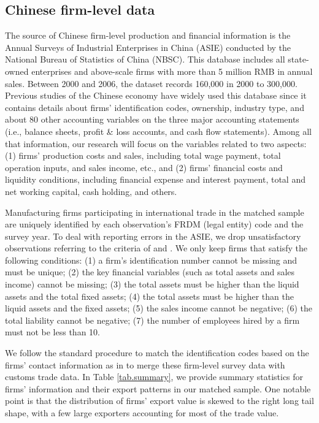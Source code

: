 \subsection{Chinese firm-level data}

The source of Chinese firm-level production and financial information is the Annual Surveys of Industrial Enterprises in China (ASIE) conducted by the National Bureau of Statistics of China (NBSC). This database includes all state-owned enterprises and above-scale firms with more than 5 million RMB in annual sales. Between 2000 and 2006, the dataset records 160,000 in 2000 to 300,000. Previous studies of the Chinese economy have widely used this database since it contains details about firms’ identification codes, ownership, industry type, and about 80 other accounting variables on the three major accounting statements (i.e., balance sheets, profit \& loss accounts, and cash flow statements). Among all that information, our research will focus on the variables related to two aspects: (1) firms' production costs and sales, including total wage payment, total operation inputs, and sales income, etc., and (2) firms' financial costs and liquidity conditions, including financial expense and interest payment, total and net working capital, cash holding, and others.

Manufacturing firms participating in international trade in the matched sample are uniquely identified by each observation's FRDM (legal entity) code and the survey year. To deal with reporting errors in the ASIE, we drop unsatisfactory observations referring to the criteria of \cite{fan2015credit} and \cite{brooks2021agglomeration}. We only keep firms that satisfy the following conditions: (1) a firm’s identification number cannot be missing and must be unique; (2) the key financial variables (such as total assets and sales income) cannot be missing;  (3) the total assets must be higher than the liquid assets and the total fixed assets; (4) the total assets must be higher than the liquid assets and the fixed assets; (5) the sales income cannot be negative; (6) the total liability cannot be negative; (7) the number of employees hired by a firm must not be less than 10.

We follow the standard procedure to match the identification codes based on the firms' contact information as in \cite{feenstra2014exports} to merge these firm-level survey data with customs trade data. In Table \ref{tab.summary}, we provide summary statistics for firms' information and their export patterns in our matched sample. One notable point is that the distribution of firms' export value is skewed to the right long tail shape, with a few large exporters accounting for most of the trade value.

